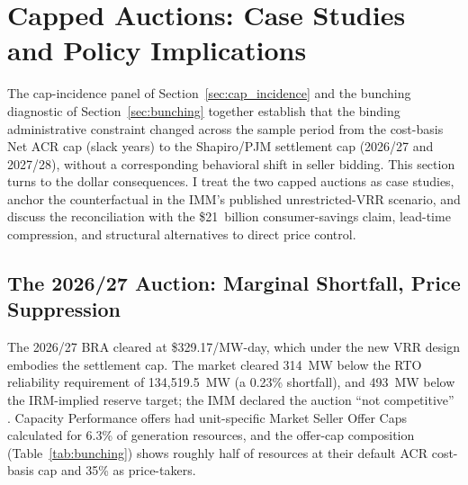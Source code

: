 
\section{Capped Auctions: Case Studies and Policy Implications}
\label{sec:21billion}

The cap-incidence panel of Section~\ref{sec:cap_incidence} and the bunching
diagnostic of Section~\ref{sec:bunching} together establish that the
binding administrative constraint changed across the sample period from
the cost-basis Net ACR cap (slack years) to the Shapiro/PJM settlement
cap (2026/27 and 2027/28), without a corresponding behavioral shift in
seller bidding. This section turns to the dollar consequences. I treat
the two capped auctions as case studies, anchor the counterfactual in
the IMM's published unrestricted-VRR scenario, and discuss the
reconciliation with the \$21~billion consumer-savings claim, lead-time
compression, and structural alternatives to direct price control.

\subsection{The 2026/27 Auction: Marginal Shortfall, Price Suppression}
\label{subsec:case_2026}

The 2026/27 BRA cleared at \$329.17/MW-day, which under the new VRR
design embodies the settlement cap. The market cleared 314~MW below the
RTO reliability requirement of 134{,}519.5~MW (a 0.23\% shortfall), and
493~MW below the IRM-implied reserve target; the IMM declared the auction
``not competitive'' \citep{MonitoringAnalytics2025_sotm}. Capacity Performance offers had
unit-specific Market Seller Offer Caps calculated for 6.3\% of
generation resources, and the offer-cap composition (Table~\ref{tab:bunching})
shows roughly half of resources at their default ACR cost-basis cap and
35\% as price-takers.

